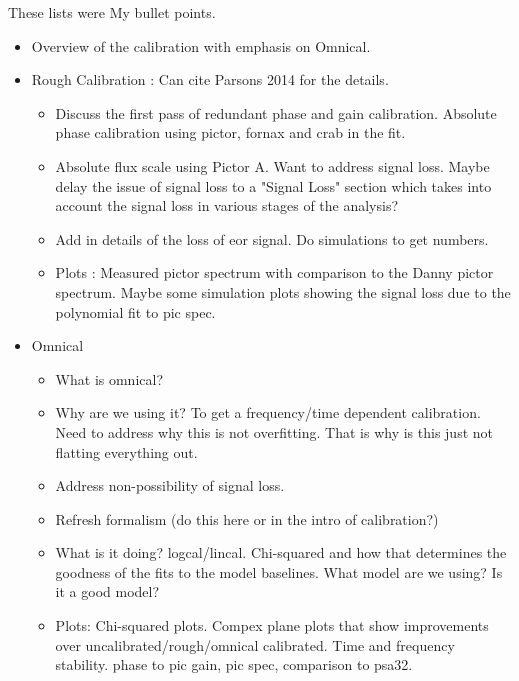 \documentclass[twocolumn,numberedappendix]{emulateapj}
\begin{document}
{These lists were My bullet points.
\begin{itemize}
    \item{Overview of the calibration with emphasis on Omnical.}
    \item{Rough Calibration : Can cite Parsons 2014 for the details.}
    \begin{itemize}
        \item{Discuss the first pass of redundant phase and gain calibration.
              Absolute phase calibration using pictor, fornax and crab in the
              fit.}
        \item{Absolute flux scale using Pictor A. Want to address signal loss.
             Maybe delay the issue of signal loss to a "Signal Loss" section
             which takes into account the signal loss in various stages of the 
             analysis?}
        \item{Add in details of the loss of eor signal. Do simulations to get
              numbers. }
        \item{Plots : Measured pictor spectrum with comparison to the Danny
              pictor spectrum. Maybe some simulation plots showing the signal
              loss due to the polynomial fit to pic spec.}
    \end{itemize}
    \item{Omnical}
    \begin{itemize}
        \item{What is omnical?}
        \item{Why are we using it? To get a frequency/time dependent
calibration. Need to address why this is not overfitting. That is why is this
just not flatting everything out.}
        \item{Address non-possibility of signal loss.}
        \item{Refresh formalism (do this here or in the intro of calibration?)}
        \item{What is it doing? logcal/lincal. Chi-squared and how that
              determines the goodness of the fits to the model baselines. What
model are we using? Is it a good model?}
        \item{Plots: Chi-squared plots. Compex plane plots that show
              improvements over uncalibrated/rough/omnical calibrated. 
              Time and frequency stability.}
    phase to pic gain, pic spec, comparison to psa32.
    \end{itemize} 
\end{itemize}


}
\end{document}
